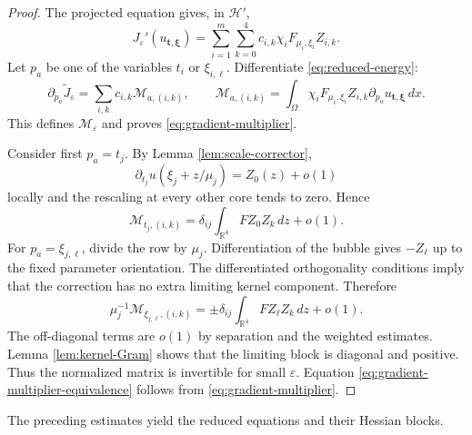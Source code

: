 \documentclass[11pt]{article}
\numberwithin{equation}{section}
\begin{document}
\begin{proof}
The projected equation gives, in $\mathcal H'$,
\begin{equation*}
J_\varepsilon'(u_{\boldsymbol t,\boldsymbol\xi})
=\sum_{i=1}^m\sum_{k=0}^4
c_{i,k}\chi_iF_{\mu_i,\xi_i}Z_{i,k}.
\end{equation*}
Let $p_a$ be one of the variables $t_i$ or $\xi_{i,\ell}$.
Differentiate \eqref{eq:reduced-energy}:
\begin{equation*}
\partial_{p_a}\widetilde J_\varepsilon
=\sum_{i,k}c_{i,k}\mathcal M_{a,(i,k)},
\qquad
\mathcal M_{a,(i,k)}
=\int_\Omega\chi_iF_{\mu_i,\xi_i}Z_{i,k}
\partial_{p_a}u_{\boldsymbol t,\boldsymbol\xi}\,dx.
\end{equation*}
This defines $\mathcal M_\varepsilon$ and proves
\eqref{eq:gradient-multiplier}.

Consider first $p_a=t_j$. By Lemma \ref{lem:scale-corrector},
\[
\partial_{t_j}u(\xi_j+z/\mu_j)=Z_0(z)+o(1)
\]
locally and the rescaling at every other core tends to zero. Hence
\begin{equation*}
\mathcal M_{t_j,(i,k)}
=\delta_{ij}\int_{\mathbb R^4}FZ_0Z_k\,dz+o(1).
\end{equation*}
For $p_a=\xi_{j,\ell}$, divide the row by $\mu_j$. Differentiation of
the bubble gives $-Z_\ell$ up to the fixed parameter orientation. The
differentiated orthogonality conditions imply that the correction has
no extra limiting kernel component. Therefore
\begin{equation*}
\mu_j^{-1}\mathcal M_{\xi_{j,\ell},(i,k)}
=\pm\delta_{ij}\int_{\mathbb R^4}FZ_\ell Z_k\,dz+o(1).
\end{equation*}
The off-diagonal terms are $o(1)$ by separation and the weighted
estimates. Lemma \ref{lem:kernel-Gram} shows that the limiting block is
diagonal and positive. Thus the normalized matrix is invertible for
small $\varepsilon$. Equation
\eqref{eq:gradient-multiplier-equivalence} follows from
\eqref{eq:gradient-multiplier}.
\end{proof}

The preceding estimates yield the reduced equations and their Hessian blocks.
\end{document}
